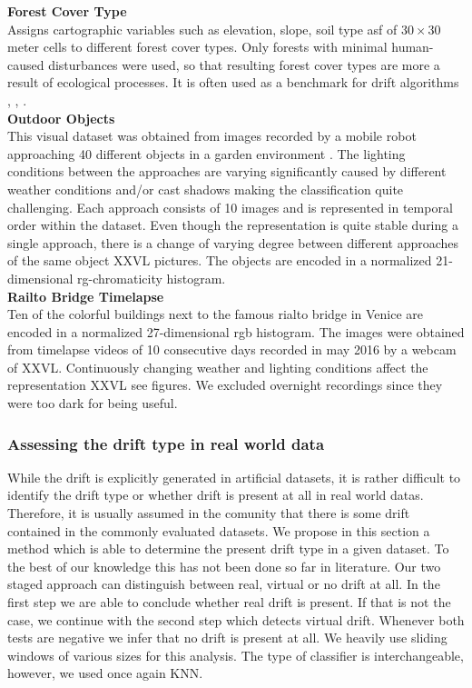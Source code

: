 \documentclass[conference]{IEEEtran}
\begin{document}
\textbf{Forest Cover Type}\\
Assigns cartographic variables such as elevation, slope, soil type asf of $30 \times 30$ meter cells to different forest cover types. 
Only forests with minimal human-caused disturbances were used, so that resulting forest cover types are more a result of ecological processes.
It is often used as a benchmark for drift algorithms \cite{Bifet:2013:EDS:2480362.2480516}, \cite{gama2003accurate}, \cite{oza2001experimental}.\\
\textbf{Outdoor Objects}\\
This visual dataset was obtained from images recorded by a mobile robot approaching 40 different objects in a garden environment \cite{losing2015interactive}. The lighting conditions between 
the approaches are varying significantly caused by different weather conditions and/or cast shadows making the classification quite challenging. Each approach
consists of 10 images and is represented in temporal order within the dataset. Even though the representation is quite stable during a single approach, there is a change of varying degree between different
approaches of the same object XXVL pictures. The objects are encoded in a normalized 21-dimensional rg-chromaticity histogram.\\
\textbf{Railto Bridge Timelapse}\\
Ten of the colorful buildings next to the famous rialto bridge in Venice are encoded in a normalized 27-dimensional rgb histogram. 
The images were obtained from timelapse videos of 10 consecutive days recorded in may 2016 by a webcam of XXVL. Continuously changing weather and lighting conditions affect the representation  XXVL see figures. We excluded overnight recordings since they were too dark for being useful.
\subsubsection{Assessing the drift type in real world data}
While the drift is explicitly generated in artificial datasets, it is rather difficult to identify the drift type or whether drift is present at all in real world datas. Therefore, it is usually
assumed in the comunity that there is some drift contained in the commonly evaluated datasets. We propose in this section a method which is able to determine the present drift type in a 
given dataset. To the best of our knowledge this has not been done so far in literature. Our two staged approach can distinguish between real, virtual or no drift at all. 
In the first step we are able to conclude whether real drift is present. If that is not the case, we continue with the second step which detects virtual drift. 
Whenever both tests are negative we infer that no drift is present at all. We heavily use sliding windows of various sizes for this analysis. 
The type of classifier is interchangeable, however, we used once again KNN.\\
\end{document}
